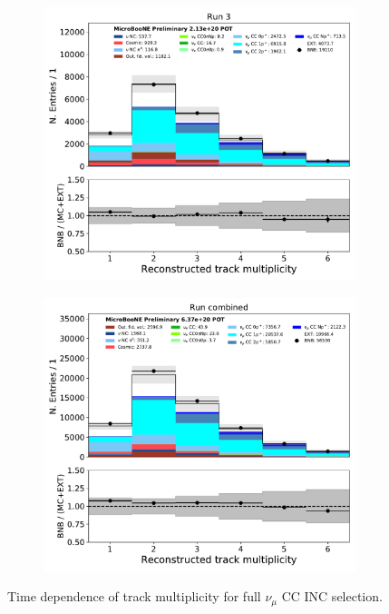 \begin{figure}[hbt!]
\begin{center}
\begin{subfigure}[b]{0.35\textwidth}
    \end{subfigure}
    \begin{subfigure}[b]{0.35\textwidth}
        \centering
        \includegraphics[width=1.00\textwidth]{NuMuCCsel/Images/Ryan/Run3_nocrt/reco_ntrack_08052020_full_samples_longest_noCRT_event_category.pdf}
    \end{subfigure} %
    \begin{subfigure}[b]{0.35\textwidth}
        \centering
        \includegraphics[width=1.00\textwidth]{NuMuCCsel/Images/Ryan/combined/reco_ntrack_08052020_full_samples_longest_noCRT_event_category.pdf}
    \end{subfigure}
\caption{Time dependence of track multiplicity for full $\nu_{\mu}$ CC INC selection.}
\label{fig:NuMuCCsel:timedep:ntrack}
\end{center}
\end{figure}

